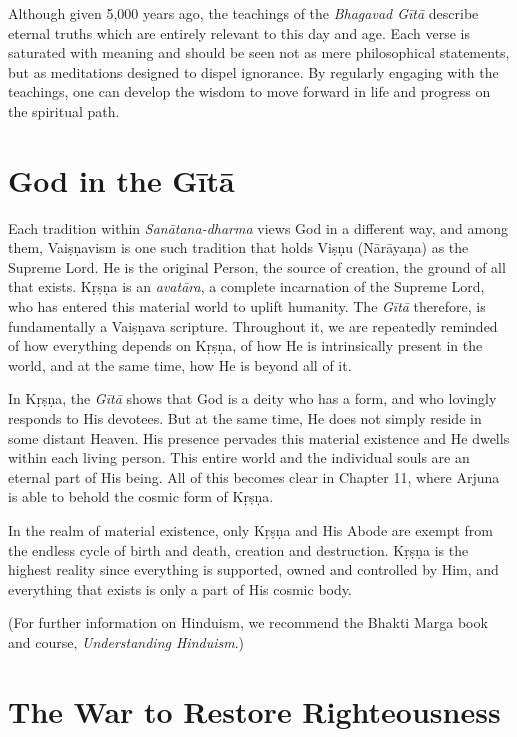 Although given 5,000 years ago, the teachings of the \textit{Bhagavad Gītā} describe eternal truths which are entirely relevant to this day and age. Each verse is saturated with meaning and should be seen not as mere philosophical statements, but as meditations designed to dispel ignorance. By regularly engaging with the teachings, one can develop the wisdom to move forward in life and progress on the spiritual path.

\section{God in the Gītā}\label{sec-god-in-the-gita}

Each tradition within \textit{Sanātana-dharma} views God in a different way, and among them, Vaiṣṇavism is one such tradition that holds Viṣṇu (Nārāyaṇa) as the Supreme Lord. He is the original Person, the source of creation, the ground of all that exists. Kṛṣṇa is an \textit{avatāra}, a complete incarnation of the Supreme Lord, who has entered this material world to uplift humanity. The \textit{Gītā} therefore, is fundamentally a Vaiṣṇava scripture. Throughout it, we are repeatedly reminded of how everything depends on Kṛṣṇa, of how He is intrinsically present in the world, and at the same time, how He is beyond all of it.

In Kṛṣṇa, the \textit{Gītā} shows that God is a deity who has a form, and who lovingly responds to His devotees. But at the same time, He does not simply reside in some distant Heaven. His presence pervades this material existence and He dwells within each living person. This entire world and the individual souls are an eternal part of His being. All of this becomes clear in Chapter 11, where Arjuna is able to behold the cosmic form of Kṛṣṇa.

In the realm of material existence, only Kṛṣṇa and His Abode are exempt from the endless cycle of birth and death, creation and destruction. Kṛṣṇa is the highest reality since everything is supported, owned and controlled by Him, and everything that exists is only a part of His cosmic body.

(For further information on Hinduism, we recommend the Bhakti Marga book and course, \textit{Understanding Hinduism}.)

\section{The War to Restore Righteousness}\label{sec-the-war-to-restore-righteousness}

